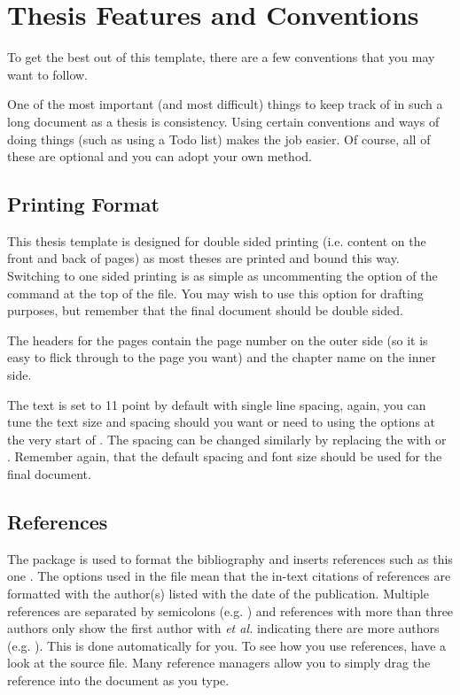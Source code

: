 
\section{Thesis Features and Conventions}\label{ThesisConventions}

To get the best out of this template, there are a few conventions that you may want to follow.

One of the most important (and most difficult) things to keep track of in such a long document as a thesis is consistency. Using certain conventions and ways of doing things (such as using a Todo list) makes the job easier. Of course, all of these are optional and you can adopt your own method.

\subsection{Printing Format}

This thesis template is designed for double sided printing (i.e. content on the front and back of pages) as most theses are printed and bound this way. Switching to one sided printing is as simple as uncommenting the  option of the  command at the top of the  file. You may wish to use this option for drafting purposes, but remember that the final document should be double sided.

The headers for the pages contain the page number on the outer side (so it is easy to flick through to the page you want) and the chapter name on the inner side.

The text is set to 11 point by default with single line spacing, again, you can tune the text size and spacing should you want or need to using the options at the very start of . The spacing can be changed similarly by replacing the  with  or . Remember again, that the default spacing and font size should be used for the final document.

\subsection{References}

The  package is used to format the bibliography and inserts references such as this one \parencite{Reference1}. The options used in the  file mean that the in-text citations of references are formatted with the author(s) listed with the date of the publication. Multiple references are separated by semicolons (e.g. \parencite{Reference2, Reference1}) and references with more than three authors only show the first author with \emph{et al.} indicating there are more authors (e.g. \parencite{Reference3}). This is done automatically for you. To see how you use references, have a look at the  source file. Many reference managers allow you to simply drag the reference into the document as you type.

